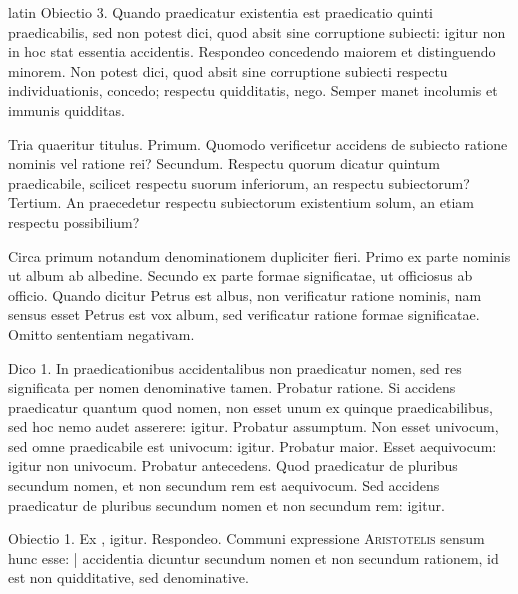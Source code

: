 \begin{otherlanguage*}{latin}
\pstart
Obiectio 3. Quando praedicatur existentia est praedicatio quinti praedicabilis, sed non potest dici, quod absit sine corruptione subiecti:
igitur non in hoc stat essentia accidentis. Respondeo concedendo maiorem et distinguendo minorem. Non potest dici, quod absit sine corruptione subiecti respectu individuationis, concedo; respectu quidditatis, nego. Semper manet incolumis et immunis quidditas. 
\pend

\pstart
{}
\pend

\pstart
Tria quaeritur titulus. Primum. Quomodo verificetur accidens de subiecto ratione nominis vel ratione rei? Secundum. Respectu quorum dicatur quintum praedicabile, scilicet respectu suorum inferiorum, an respectu subiectorum? Tertium. An praecedetur respectu subiectorum existentium solum, an etiam respectu possibilium? 
\pend

\pstart
Circa primum notandum denominationem dupliciter fieri. Primo ex parte nominis ut album ab albedine. Secundo ex parte formae significatae, ut officiosus ab officio. Quando dicitur Petrus est albus, non verificatur ratione nominis, nam sensus esset Petrus est vox album, sed verificatur ratione formae significatae. Omitto sententiam negativam. 
\pend

\pstart
Dico 1. In praedicationibus accidentalibus non praedicatur nomen, sed res significata per nomen denominative tamen. Probatur ratione. Si accidens praedicatur quantum quod nomen, non esset unum ex quinque praedicabilibus, sed hoc nemo audet asserere:
igitur. Probatur assumptum. Non esset univocum, sed omne praedicabile est univocum:
igitur. Probatur maior. Esset aequivocum:
igitur non univocum. Probatur antecedens. Quod praedicatur de pluribus secundum nomen, et non secundum rem est aequivocum. Sed accidens praedicatur de pluribus secundum nomen et non secundum rem:
igitur. 
\pend

\pstart
Obiectio 1. Ex , igitur. Respondeo. Communi expressione \textsc{Aristotelis} sensum hunc esse:
\textnormal{|} accidentia dicuntur secundum nomen et non secundum rationem, id est non quidditative, sed denominative. 
\pend


\end{otherlanguage*}
